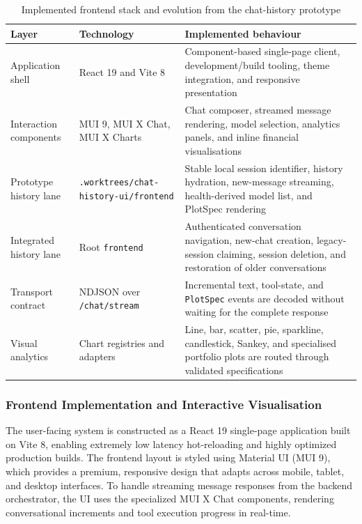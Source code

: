 \documentclass[11pt]{article}
\begin{document}
\begin{table}[htbp]
\centering
\small
\caption{Implemented frontend stack and evolution from the chat-history prototype}
\label{tab:frontend-implementation}
\begin{tabular}{L{3.0cm}L{4.0cm}L{6.0cm}}
\toprule
\textbf{Layer} & \textbf{Technology} & \textbf{Implemented behaviour} \\
\midrule
Application shell & React 19 and Vite 8 & Component-based single-page client, development/build tooling, theme integration, and responsive presentation \\
Interaction components & MUI 9, MUI X Chat, MUI X Charts & Chat composer, streamed message rendering, model selection, analytics panels, and inline financial visualisations \\
Prototype history lane & \texttt{.worktrees/chat-history-ui/frontend} & Stable local session identifier, history hydration, new-message streaming, health-derived model list, and PlotSpec rendering \\
Integrated history lane & Root \texttt{frontend} & Authenticated conversation navigation, new-chat creation, legacy-session claiming, session deletion, and restoration of older conversations \\
Transport contract & NDJSON over \texttt{/chat/stream} & Incremental text, tool-state, and \texttt{PlotSpec} events are decoded without waiting for the complete response \\
Visual analytics & Chart registries and adapters & Line, bar, scatter, pie, sparkline, candlestick, Sankey, and specialised portfolio plots are routed through validated specifications \\
\bottomrule
\end{tabular}
\end{table}

\subsubsection{Frontend Implementation and Interactive Visualisation}
\label{sec:frontend-implementation-detail}

The user-facing system is constructed as a React 19 single-page application built on Vite 8, enabling extremely low latency hot-reloading and highly optimized production builds. The frontend layout is styled using Material UI (MUI 9), which provides a premium, responsive design that adapts across mobile, tablet, and desktop interfaces. To handle streaming message responses from the backend orchestrator, the UI uses the specialized MUI X Chat components, rendering conversational increments and tool execution progress in real-time.
\end{document}
